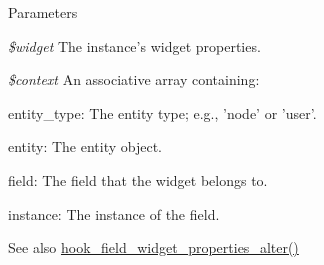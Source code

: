 \begin{DoxyParams}{Parameters}
\item[{\em \$widget}]The instance's widget properties. \item[{\em \$context}]An associative array containing:
\begin{DoxyItemize}
\item entity\_\-type: The entity type; e.g., 'node' or 'user'.
\item entity: The entity object.
\item field: The field that the widget belongs to.
\item instance: The instance of the field.
\end{DoxyItemize}\end{DoxyParams}
\begin{DoxySeeAlso}{See also}
\hyperlink{group__field__widget_gaa88988bce1ffbec1f481ec7a3ba87e51}{hook\_\-field\_\-widget\_\-properties\_\-alter()} 
\end{DoxySeeAlso}
